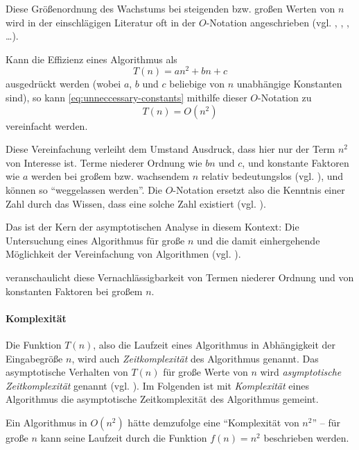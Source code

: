 Diese Größenordnung des Wachstums bei steigenden bzw. großen Werten von $n$ wird in der einschlägigen Literatur oft in der $O$-Notation angeschrieben (vgl. \cite[2]{ahu1974}, \cite[107]{taocp1}, \cite[29]{hsr1997}, \ldots).

Kann die Effizienz eines Algorithmus als
\begin{equation}\label{eq:unneccessary-constants}
    T(n) = an^2 + bn + c
\end{equation}
ausgedrückt werden (wobei $a$, $b$ und $c$ beliebige von $n$ unabhängige Konstanten sind), so kann \eqref{eq:unneccessary-constants} mithilfe dieser $O$-Notation zu
\begin{equation}\label{eq:basic-o-notation}
    T(n) = O(n^2)
\end{equation}
vereinfacht werden.

Diese Vereinfachung verleiht dem Umstand Ausdruck, dass hier nur der Term $n^2$ von Interesse ist. Terme niederer Ordnung wie $bn$ und $c$, und konstante Faktoren wie $a$ werden bei großem bzw. wachsendem $n$ relativ bedeutungslos (vgl. \cite[28]{clrs2001}), und können so \enquote{weggelassen werden}. Die $O$-Notation ersetzt also die Kenntnis einer Zahl durch das Wissen, dass eine solche Zahl existiert (vgl. \cite[3]{bru1958}).

Das ist der Kern der asymptotischen Analyse in diesem Kontext: Die Untersuchung eines Algorithmus für große $n$ und die damit einhergehende Möglichkeit der Vereinfachung von Algorithmen (vgl. \cite[63]{sha2011}).



 veranschaulicht diese Vernachlässigbarkeit von Termen niederer Ordnung und von konstanten Faktoren bei großem $n$.

\paragraph{Komplexität} Die Funktion $T(n)$, also die Laufzeit eines Algorithmus in Abhängigkeit der Eingabegröße $n$, wird auch \emph{Zeitkomplexität} des Algorithmus genannt. Das asymptotische Verhalten von $T(n)$ für große Werte von $n$ wird \emph{asymptotische Zeitkomplexität} genannt (vgl. \cite[2]{ahu1974}). Im Folgenden ist mit \emph{Komplexität} eines Algorithmus die asymptotische Zeitkomplexität des Algorithmus gemeint.

Ein Algorithmus in $O(n^2)$ hätte demzufolge eine \enquote{Komplexität von $n^2$} -- für große $n$ kann seine Laufzeit durch die Funktion $f(n) = n^2$ beschrieben werden.

